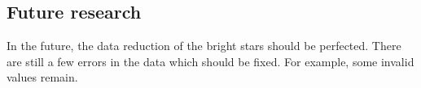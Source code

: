 \documentclass{aa}
\begin{document}

\subsection{Future research}
In the future, the data reduction of the bright stars should be perfected. There are still a few errors in the data which should be fixed. For example, some invalid values remain.
\end{document}
